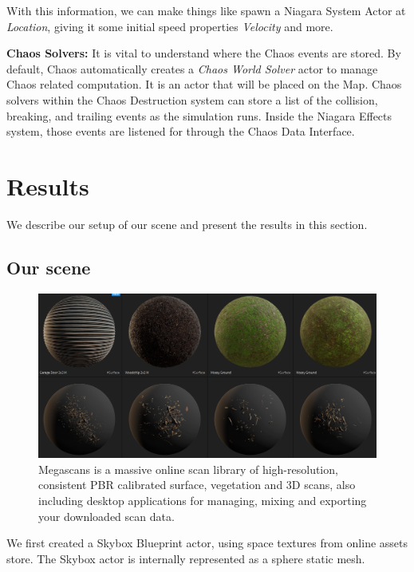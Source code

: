 \documentclass[sigconf]{acmart}
\begin{document}
With this information, we can make things like spawn a Niagara System Actor at \textit{Location}, giving it some initial speed properties \textit{Velocity} and more. 

\textbf{Chaos Solvers:} It is vital to understand where the Chaos events are stored. By default, Chaos automatically creates a \textit{Chaos World Solver} actor to manage Chaos related computation. It is an actor that will be placed on the Map. Chaos solvers within the Chaos Destruction system can store a list of the collision, breaking, and trailing events as the simulation runs. Inside the Niagara Effects system, those events are listened for through the Chaos Data Interface. 

\section{Results}

We describe our setup of our scene and present the results in this section. 

\subsection{Our scene}

\begin{figure}[ht]
  \centering
  \includegraphics[width=\linewidth]{aaafiles/quixel.png}
  \caption{Megascans is a massive online scan library of high-resolution, consistent PBR calibrated surface, vegetation and 3D scans, also including desktop applications for managing, mixing and exporting your downloaded scan data.}
  \label{fig:quixel}
\end{figure}

We first created a Skybox Blueprint actor, using space textures from online assets store. The Skybox actor is internally represented as a sphere static mesh. 
\end{document}
